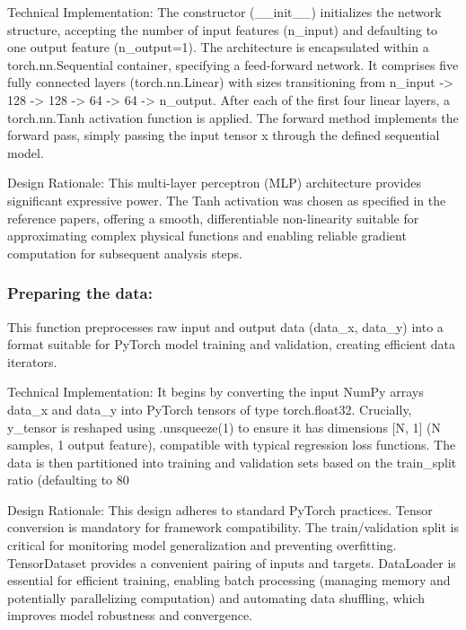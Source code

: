 \documentclass{article}
\begin{document}
Technical Implementation: The constructor (__init__) initializes the network structure, accepting the number of input features (n_input) and defaulting to one output feature (n_output=1). The architecture is encapsulated within a torch.nn.Sequential container, specifying a feed-forward network. It comprises five fully connected layers (torch.nn.Linear) with sizes transitioning from n_input -> 128 -> 128 -> 64 -> 64 -> n_output. After each of the first four linear layers, a torch.nn.Tanh activation function is applied. The forward method implements the forward pass, simply passing the input tensor x through the defined sequential model.

Design Rationale: This multi-layer perceptron (MLP) architecture provides significant expressive power. The Tanh activation was chosen as specified in the reference papers, offering a smooth, differentiable non-linearity suitable for approximating complex physical functions and enabling reliable gradient computation for subsequent analysis steps.\\

\subsubsection{ Preparing the data: }

This function preprocesses raw input and output data (data_x, data_y) into a format suitable for PyTorch model training and validation, creating efficient data iterators.

Technical Implementation: It begins by converting the input NumPy arrays data_x and data_y into PyTorch tensors of type torch.float32. Crucially, y_tensor is reshaped using .unsqueeze(1) to ensure it has dimensions [N, 1] (N samples, 1 output feature), compatible with typical regression loss functions. The data is then partitioned into training and validation sets based on the train_split ratio (defaulting to 80%

Design Rationale: This design adheres to standard PyTorch practices. Tensor conversion is mandatory for framework compatibility. The train/validation split is critical for monitoring model generalization and preventing overfitting. TensorDataset provides a convenient pairing of inputs and targets. DataLoader is essential for efficient training, enabling batch processing (managing memory and potentially parallelizing computation) and automating data shuffling, which improves model robustness and convergence.\\
\end{document}
